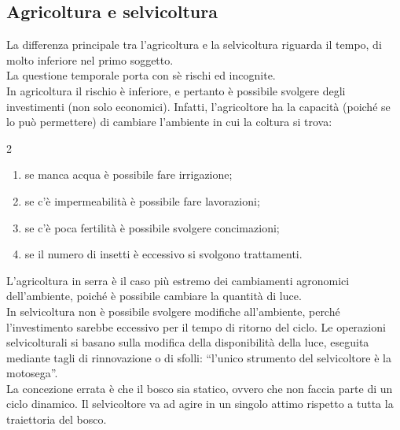\subsection{Agricoltura e selvicoltura}
La differenza principale tra l'agricoltura e la selvicoltura riguarda il tempo, di molto inferiore nel primo soggetto.\\
La questione temporale porta con sè rischi ed incognite.\\
In agricoltura il rischio è inferiore, e pertanto è possibile svolgere degli investimenti (non solo economici). Infatti, l'agricoltore ha la capacità (poiché se lo può permettere) di cambiare l'ambiente in cui la coltura si trova:
\begin{multicols}{2}
    \begin{enumerate}[nosep]
        \item se manca acqua è possibile fare irrigazione;
        \item se c'è impermeabilità è possibile fare lavorazioni;
        \item se c'è poca fertilità è possibile svolgere concimazioni;
        \item se il numero di insetti è eccessivo si svolgono trattamenti.
    \end{enumerate}
\end{multicols}
L'agricoltura in serra è il caso più estremo dei cambiamenti agronomici dell'ambiente, poiché è possibile cambiare la quantità di luce.\\
In selvicoltura non è possibile svolgere modifiche all'ambiente, perché l'investimento sarebbe eccessivo per il tempo di ritorno del ciclo. Le operazioni selvicolturali si basano sulla modifica della disponibilità della luce, eseguita mediante tagli di rinnovazione o di sfolli: ``l'unico strumento del selvicoltore è la motosega''.\\
La concezione errata è che il bosco sia statico, ovvero che non faccia parte di un ciclo dinamico. Il selvicoltore va ad agire in un singolo attimo rispetto a tutta la traiettoria del bosco.
